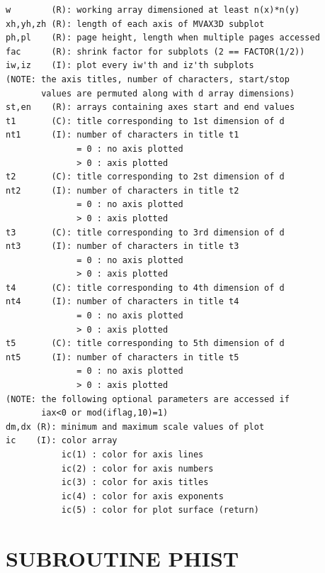 \documentclass[11pt]{report}
\begin{document}
\begin{verbatim}
w        (R): working array dimensioned at least n(x)*n(y)
xh,yh,zh (R): length of each axis of MVAX3D subplot
ph,pl    (R): page height, length when multiple pages accessed
fac      (R): shrink factor for subplots (2 == FACTOR(1/2))
iw,iz    (I): plot every iw'th and iz'th subplots
(NOTE: the axis titles, number of characters, start/stop
       values are permuted along with d array dimensions)
st,en    (R): arrays containing axes start and end values
t1       (C): title corresponding to 1st dimension of d
nt1      (I): number of characters in title t1
              = 0 : no axis plotted
              > 0 : axis plotted
t2       (C): title corresponding to 2st dimension of d
nt2      (I): number of characters in title t2
              = 0 : no axis plotted
              > 0 : axis plotted
t3       (C): title corresponding to 3rd dimension of d
nt3      (I): number of characters in title t3
              = 0 : no axis plotted
              > 0 : axis plotted
t4       (C): title corresponding to 4th dimension of d
nt4      (I): number of characters in title t4
              = 0 : no axis plotted
              > 0 : axis plotted
t5       (C): title corresponding to 5th dimension of d
nt5      (I): number of characters in title t5
              = 0 : no axis plotted
              > 0 : axis plotted
(NOTE: the following optional parameters are accessed if
       iax<0 or mod(iflag,10)=1)
dm,dx (R): minimum and maximum scale values of plot
ic    (I): color array
           ic(1) : color for axis lines
           ic(2) : color for axis numbers
           ic(3) : color for axis titles
           ic(4) : color for axis exponents
           ic(5) : color for plot surface (return)
\end{verbatim}

\newpage
\section{SUBROUTINE PHIST}
\end{document}
